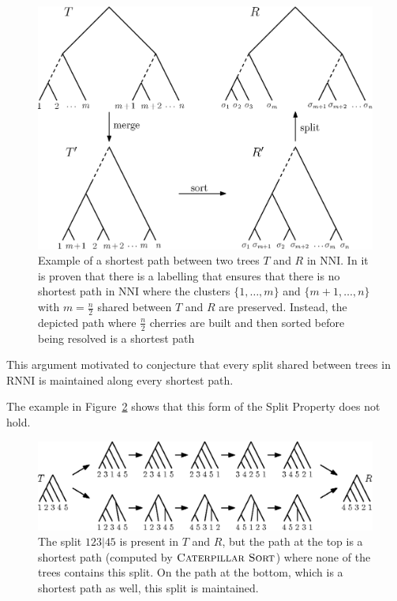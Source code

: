 \documentclass{amsart}
\newcommand{\nni}{\mathrm{NNI}}
\newcommand{\rnni}{\mathrm{RNNI}}
\newcommand{\csort}{\textsc{Caterpillar Sort}}
\begin{document}
\begin{figure}[H]
\centering
\includegraphics[width=.8\textwidth]{NNI_NP_proof}
\vspace{12pt}
\caption{Example of a shortest path between two trees $T$ and $R$ in $\nni$.
In \autocite{Li1996-zw} it is proven that there is a labelling that ensures that there is no shortest path in $\nni$ where the clusters $\{1, \ldots, m\}$ and $\{m+1, \ldots, n\}$ with $m = \frac{n}{2}$ shared between $T$ and $R$ are preserved.
Instead, the depicted path where $\frac{n}{2}$ cherries are built and then sorted before being resolved is a shortest path}
\label{fig:NNI_NP_proof}
\end{figure}

This argument motivated \textcite[Conjecture~9]{Gavryushkin2018-ol} to conjecture that every split shared between trees in $\rnni$ is maintained along every shortest path.

The example in Figure~\ref{fig:splitthm_counterexample} shows that this form of the Split Property does not hold.

\begin{figure}[H]
\centering
\includegraphics[width=\textwidth]{splitthm_counterexample}
\vspace{12pt}
\caption{The split $123|45$ is present in $T$ and $R$, but the path at the top is a shortest path (computed by $\csort$) where none of the trees contains this split.
On the path at the bottom, which is a shortest path as well, this split is maintained.}
\label{fig:splitthm_counterexample}
\end{figure}
\end{document}
